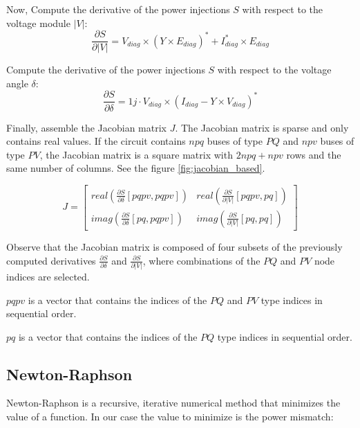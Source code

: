 \documentclass[a4paper,twoside]{tufte-book}
\begin{document}
Now, Compute the derivative of the power injections $S$ with respect to the voltage module $|V|$:
\begin{equation}
\frac{\partial S}{\partial |V|} = V_{diag} \times (Y \times E_{diag})^* + I_{diag}^* \times  E_{diag}
\end{equation}
    
Compute the derivative of the power injections $S$ with respect to the voltage angle $\delta$:
\begin{equation}
\frac{\partial S}{\partial \delta} = 1j \cdot V_{diag} \times (I_{diag} - Y \times V_{diag})^*
\end{equation}

Finally, assemble the Jacobian matrix $J$. The Jacobian matrix is sparse and only contains real values. If the circuit contains $npq$ buses of type $PQ$ and $npv$ buses of type $PV$, the Jacobian matrix is a square matrix with $2 npq + npv$ rows and the same number of columns. See the figure \ref{fig:jacobian_based}.

\begin{equation}
J=
\left[
\begin{array}{cc}
real\left(\frac{\partial S}{\partial \delta}[pqpv, pqpv]\right) &
real\left(\frac{\partial S}{\partial |V|}[pqpv, pq]\right) \\
imag\left(\frac{\partial S}{\partial \delta}[pq, pqpv]\right) &
imag\left(\frac{\partial S}{\partial |V|}[pq, pq]\right)
\end{array}
\right]
\end{equation}

Observe that the Jacobian matrix is composed of four subsets of the previously computed derivatives $\frac{\partial S}{\partial \delta}$ and $\frac{\partial S}{\partial |V|}$, where combinations of the $PQ$ and $PV$ node indices are selected.

$pqpv$ is a vector that contains the indices of the $PQ$ and $PV$ type indices in sequential order.

$pq$ is a vector that contains the indices of the $PQ$  type indices in sequential order.

\newpage
\subsection{Newton-Raphson}

Newton-Raphson is a recursive, iterative numerical method that minimizes the value of a function. In our case the value to minimize is the power mismatch:
\end{document}
